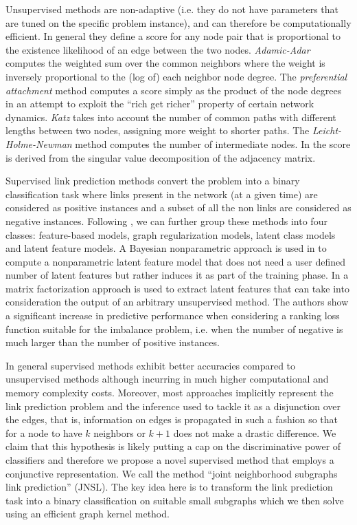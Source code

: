 Unsupervised methods are non-adaptive (i.e. they do not have parameters that are tuned on the specific problem instance), and can therefore be computationally efficient. In general they define a score for any node pair that is proportional to the existence likelihood of an edge between the two nodes. \textit{Adamic-Adar} \cite{adamic} computes the weighted sum over the common neighbors where the weight is inversely proportional to the (log of) each neighbor node degree. The \textit{preferential attachment} method computes a score simply as the product of the node degrees in an attempt to exploit the ``rich get richer'' property of certain network dynamics. \textit{Katz} \cite{katz} takes into account the number of common paths with different lengths between two nodes, assigning more weight to shorter paths. The \textit{Leicht-Holme-Newman} method \cite{lhni} computes the number of intermediate nodes. In \cite{matrix-factorization} the score is derived from the singular value decomposition of the adjacency matrix. 

Supervised link prediction methods convert the problem into a binary classification task where links present in the network (at a given time) are considered as positive instances and a subset of all the non links are considered as negative instances. Following \cite{matrix-factorization}, we can further group these methods into four classes: feature-based models, graph regularization models, latent class models and latent feature models. 
A Bayesian nonparametric approach is used in \cite{nonparametric} to compute a nonparametric latent feature model that does not need a user defined number of latent features but rather induces it as part of the training phase. 
In \cite{matrix-factorization} a matrix factorization approach is used to extract latent features that can take into consideration the output of an arbitrary unsupervised method. The authors show a significant increase in predictive performance when considering a ranking loss function suitable for  the imbalance problem, i.e. when the number of negative is much larger than the number of positive instances. 

In general supervised methods exhibit better accuracies compared to unsupervised methods although incurring in much higher computational and memory complexity costs.
Moreover, most approaches implicitly represent the link prediction problem and the inference used to tackle it as a disjunction over the edges, that is, information on edges is propagated in such a fashion so that for a node to have $k$ neighbors or $k+1$ does not make a drastic difference.
We claim that this hypothesis is likely putting a cap on the discriminative power of classifiers and therefore we propose a novel supervised method that employs a conjunctive representation. We call the method ``joint neighborhood subgraphs link prediction'' (JNSL). The key idea here is to transform the link prediction task into a binary classification on suitable small subgraphs which we then solve using an efficient graph kernel method.

